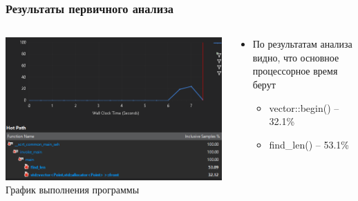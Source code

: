 \documentclass[10pt]{beamer}
\begin{document}
\begin{frame}
\frametitle{Результаты первичного анализа}


\begin{columns}[c]

\begin{center}
  \includegraphics[width=\textwidth]{res/img/AnalysisTargetWizard1SummaryCropped.png}
  График выполнения программы
\end{center}

\begin{block}{}
  \begin{itemize}
    \item По результатам анализа видно, что основное процессорное время берут
    \begin{itemize}
      \item vector::begin() -- 32.1\%
      \item find\_len() -- 53.1\%
    \end{itemize}
  \end{itemize}
\end{block}

\end{columns}

\end{frame}
\end{document}
